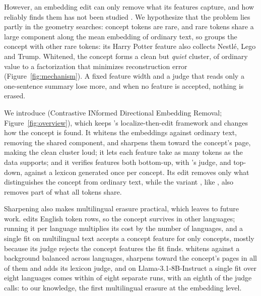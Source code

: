 However, an embedding edit can only remove what its features capture, and how reliably \ember{} finds them has not been studied \citep[Limitations]{suslik2026ember}.
We hypothesize that the problem lies partly in the geometry \ember{} searches: concept tokens are rare, and rare tokens share a large component along the mean embedding of ordinary text, so \ember{} groups the concept with other rare tokens: its Harry Potter feature also collects Nestl\'e, Lego and Trump.
Whitened, the concept forms a clean but \emph{quiet} cluster, of ordinary value to a factorization that minimizes reconstruction error (Figure~\ref{fig:mechanism}).
A fixed feature width and a judge that reads only a one-sentence summary lose more, and when no feature is accepted, nothing is erased.

We introduce \cinder{} (Contrastive INformed Directional Embedding Removal; Figure~\ref{fig:overview}), which keeps \ember{}'s localize-then-edit framework and changes how the concept is found.
It whitens the embeddings against ordinary text, removing the shared component, and sharpens them toward the concept's page, making the clean cluster loud; it lets each feature take as many tokens as the data supports; and it verifies features both bottom-up, with \ember{}'s judge, and top-down, against a lexicon generated once per concept.
Its edit removes only what distinguishes the concept from ordinary text, while the variant \cinderz{}, like \ember{}, also removes part of what all tokens share.

Sharpening also makes multilingual erasure practical, which \ember{} leaves to future work.
\ember{} edits English token rows, so the concept survives in other languages; running it per language multiplies its cost by the number of languages, and a single \ember{} fit on multilingual text accepts a concept feature for only  concepts, mostly because its judge rejects the concept features the fit finds.
\cinder{} whitens against a background balanced across languages, sharpens toward the concept's pages in all of them and adds its lexicon judge, and on Llama-3.1-8B-Instruct \citep{grattafiori2024llama3} a single \cinderz{} fit over eight languages comes within  of eight separate \ember{} runs, with an eighth of the judge calls: to our knowledge, the first multilingual erasure at the embedding level.

